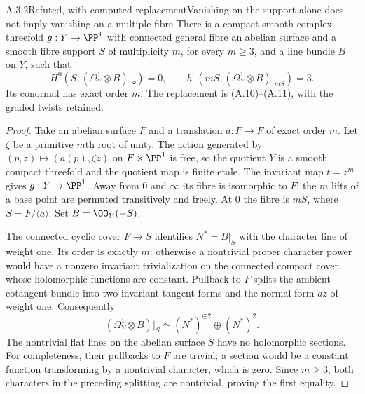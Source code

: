 \begin{statement}{A.3.2}{Refuted, with computed replacement}{Vanishing on the support alone does not imply vanishing on a multiple fibre}
There is a compact smooth complex threefold $g:Y\to\PP^1$ with connected general fibre an abelian surface and a smooth fibre support $S$ of multiplicity $m$, for every $m\ge3$, and a line bundle $B$ on $Y$, such that
\[
H^0(S,(\Omega_Y^1\otimes B)|_S)=0,
\qquad h^0(mS,(\Omega_Y^1\otimes B)|_{mS})=3.
\tag{A.12}
\]
Its conormal has exact order $m$. The replacement is (A.10)--(A.11), with the graded twists retained.
\end{statement}
\begin{proof}
Take an abelian surface $F$ and a translation $a:F\to F$ of exact order $m$. Let $\zeta$ be a primitive $m$th root of unity. The action generated by $(p,z)\mapsto(a(p),\zeta z)$ on $F\times\PP^1$ is free, so the quotient $Y$ is a smooth compact threefold and the quotient map is finite etale. The invariant map $t=z^m$ gives $g:Y\to\PP^1$. Away from $0$ and $\infty$ its fibre is isomorphic to $F$: the $m$ lifts of a base point are permuted transitively and freely. At $0$ the fibre is $mS$, where $S=F/\langle a\rangle$. Set $B=\OO_Y(-S)$.

The connected cyclic cover $F\to S$ identifies $N^*=B|_S$ with the character line of weight one. Its order is exactly $m$: otherwise a nontrivial proper character power would have a nonzero invariant trivialization on the connected compact cover, whose holomorphic functions are constant. Pullback to $F$ splits the ambient cotangent bundle into two invariant tangent forms and the normal form $dz$ of weight one. Consequently
\[
 (\Omega_Y^1\otimes B)|_S\simeq (N^*)^{\oplus2}\oplus(N^*)^2.
\]
The nontrivial flat lines on the abelian surface $S$ have no holomorphic sections. For completeness, their pullbacks to $F$ are trivial; a section would be a constant function transforming by a nontrivial character, which is zero. Since $m\ge3$, both characters in the preceding splitting are nontrivial, proving the first equality.


\end{proof}
